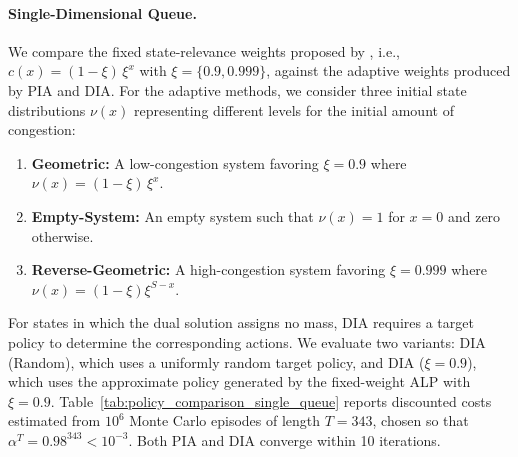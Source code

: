 \documentclass[sglanonrev]{informs4}
\def\edits#1{{\color{black}#1}}
\begin{document}
\paragraph{Single-Dimensional Queue.} We compare the fixed state-relevance weights proposed by \citet{de2003linear}, i.e., $c(x) = (1-\xi)\,\xi^x$ with $\xi = \{0.9,0.999\}$, against the adaptive weights produced by \ac{PIA} and \ac{DIA}. For the adaptive methods, we consider three initial state distributions $\nu(x)$ representing different levels for the initial amount of congestion:
    \begin{enumerate}
  \item \textbf{Geometric:} A low-congestion system favoring $\xi=0.9$ where $\nu(x) = (1-\xi)\,\xi^x$.
  \item \textbf{Empty-System:} An empty system such that $\nu(x) = 1$ for $x=0$ and zero otherwise.
    \item \textbf{Reverse-Geometric:} A high-congestion system favoring $\xi = 0.999$ where $\nu(x) = (1-\xi)\xi^{S-x}$.
\end{enumerate}

\edits{For states in which the dual solution assigns no mass, \ac{DIA} requires a target policy to determine the corresponding actions. We evaluate two variants: \ac{DIA} (Random), which uses a uniformly random target policy, and \ac{DIA} ($\xi=0.9$), which uses the approximate policy generated by the fixed-weight \ac{ALP} with $\xi=0.9$. Table~\ref{tab:policy_comparison_single_queue} reports discounted costs estimated from $10^6$ Monte Carlo episodes of length $T=343$, chosen so that $\alpha^T=0.98^{343}<10^{-3}$. Both \ac{PIA} and \ac{DIA} converge within 10 iterations.}
\end{document}
